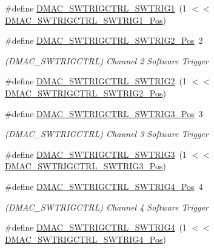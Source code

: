 \begin{DoxyCompactItemize}
\#define \mbox{\hyperlink{group___s_a_m_d21___d_m_a_c_ga3dd0447ef72a3087d7936fc2ee1da4b3}{D\+M\+A\+C\+\_\+\+S\+W\+T\+R\+I\+G\+C\+T\+R\+L\+\_\+\+S\+W\+T\+R\+I\+G1}}~(1 $<$$<$ \mbox{\hyperlink{group___s_a_m_d21___d_m_a_c_gaef347c4c8af907245a83b5d099339e30}{D\+M\+A\+C\+\_\+\+S\+W\+T\+R\+I\+G\+C\+T\+R\+L\+\_\+\+S\+W\+T\+R\+I\+G1\+\_\+\+Pos}})
\item 
\#define \mbox{\hyperlink{group___s_a_m_d21___d_m_a_c_ga1913259e7e96e88875374e1662761850}{D\+M\+A\+C\+\_\+\+S\+W\+T\+R\+I\+G\+C\+T\+R\+L\+\_\+\+S\+W\+T\+R\+I\+G2\+\_\+\+Pos}}~2
\begin{DoxyCompactList}\small\item\em (D\+M\+A\+C\+\_\+\+S\+W\+T\+R\+I\+G\+C\+T\+RL) Channel 2 Software Trigger \end{DoxyCompactList}\item 
\#define \mbox{\hyperlink{group___s_a_m_d21___d_m_a_c_gacb6bbf77bf4630410122a08cdf37019d}{D\+M\+A\+C\+\_\+\+S\+W\+T\+R\+I\+G\+C\+T\+R\+L\+\_\+\+S\+W\+T\+R\+I\+G2}}~(1 $<$$<$ \mbox{\hyperlink{group___s_a_m_d21___d_m_a_c_ga1913259e7e96e88875374e1662761850}{D\+M\+A\+C\+\_\+\+S\+W\+T\+R\+I\+G\+C\+T\+R\+L\+\_\+\+S\+W\+T\+R\+I\+G2\+\_\+\+Pos}})
\item 
\#define \mbox{\hyperlink{group___s_a_m_d21___d_m_a_c_ga116d94d4f4ed98c7f47fb91ee911ca1e}{D\+M\+A\+C\+\_\+\+S\+W\+T\+R\+I\+G\+C\+T\+R\+L\+\_\+\+S\+W\+T\+R\+I\+G3\+\_\+\+Pos}}~3
\begin{DoxyCompactList}\small\item\em (D\+M\+A\+C\+\_\+\+S\+W\+T\+R\+I\+G\+C\+T\+RL) Channel 3 Software Trigger \end{DoxyCompactList}\item 
\#define \mbox{\hyperlink{group___s_a_m_d21___d_m_a_c_ga9cb68aa42ce204eed9d6e0be7d2e9e7d}{D\+M\+A\+C\+\_\+\+S\+W\+T\+R\+I\+G\+C\+T\+R\+L\+\_\+\+S\+W\+T\+R\+I\+G3}}~(1 $<$$<$ \mbox{\hyperlink{group___s_a_m_d21___d_m_a_c_ga116d94d4f4ed98c7f47fb91ee911ca1e}{D\+M\+A\+C\+\_\+\+S\+W\+T\+R\+I\+G\+C\+T\+R\+L\+\_\+\+S\+W\+T\+R\+I\+G3\+\_\+\+Pos}})
\item 
\#define \mbox{\hyperlink{group___s_a_m_d21___d_m_a_c_ga012eb24abb291ce4471d9efb00a50f00}{D\+M\+A\+C\+\_\+\+S\+W\+T\+R\+I\+G\+C\+T\+R\+L\+\_\+\+S\+W\+T\+R\+I\+G4\+\_\+\+Pos}}~4
\begin{DoxyCompactList}\small\item\em (D\+M\+A\+C\+\_\+\+S\+W\+T\+R\+I\+G\+C\+T\+RL) Channel 4 Software Trigger \end{DoxyCompactList}\item 
\#define \mbox{\hyperlink{group___s_a_m_d21___d_m_a_c_gae3c4c471ad55c5ad9aefcd3cfb45b175}{D\+M\+A\+C\+\_\+\+S\+W\+T\+R\+I\+G\+C\+T\+R\+L\+\_\+\+S\+W\+T\+R\+I\+G4}}~(1 $<$$<$ \mbox{\hyperlink{group___s_a_m_d21___d_m_a_c_ga012eb24abb291ce4471d9efb00a50f00}{D\+M\+A\+C\+\_\+\+S\+W\+T\+R\+I\+G\+C\+T\+R\+L\+\_\+\+S\+W\+T\+R\+I\+G4\+\_\+\+Pos}})

\end{DoxyCompactItemize}
